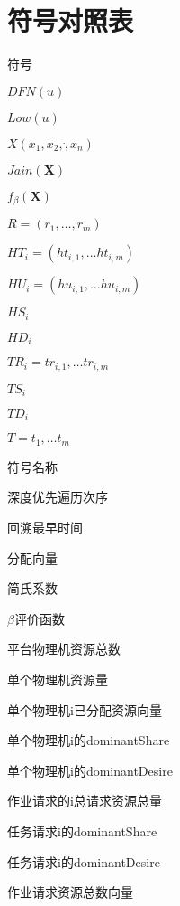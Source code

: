 
\chapter*{符号对照表}
\begin{multicols}{2}
符号

$DFN(u)$

$Low(u)$

$X({x}_{1},{x}_{2},\dot,{x}_{n})$

$Jain(\textbf{X}) $

${f}_{\beta} (\textbf{X})$

$R=\left({r}_{1},…,{r}_{m}\right)$

${HT}_{i}=\left({ht}_{i,1},…{ht}_{i,m} \right)$

${HU}_{i}=\left({hu}_{i,1},…{hu}_{i,m}\right)$

${HS}_{i} $

${HD}_{i}$

${TR}_{i}={{tr}_{i,1},…{tr}_{i,m}}$

${TS}_{i}$

${TD}_{i}$

$T={{t}_{1},…{t}_{m}}$

符号名称

深度优先遍历次序

回溯最早时间

分配向量

简氏系数

$\beta$评价函数

平台物理机资源总数

单个物理机资源量

单个物理机i已分配资源向量

单个物理机i的dominantShare

单个物理机i的dominantDesire

作业请求的i总请求资源总量

任务请求i的dominantShare

任务请求i的dominantDesire

作业请求资源总数向量

\end{multicols}